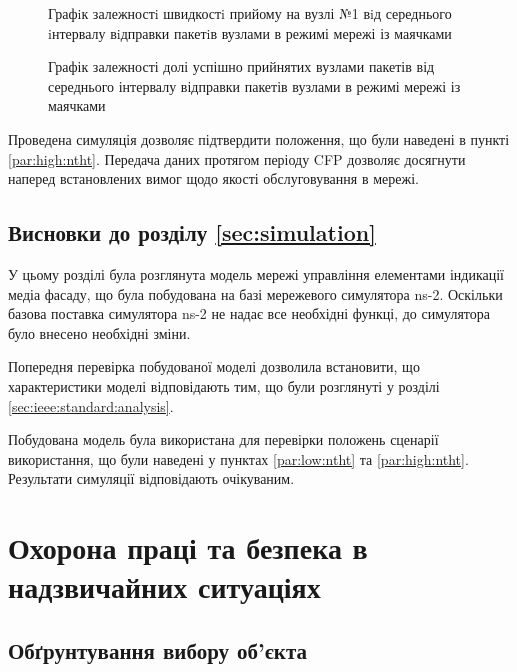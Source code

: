 \documentclass[a4paper,ukrainian,utf8,nocolumnsxix,floatsection,equationsection]{eskdtext}
\begin{document}
\begin{figure}[h]
	\centering
	\caption{\label{fig:result_test_backtraf_beac_brd_tp1}Графiк залежностi швидкостi прийому на вузлі №1 вiд середнього iнтервалу вiдправки пакетiв вузлами в режимі мережі із маячками}
\end{figure}

\begin{figure}[h]
	\centering
	\caption{\label{fig:result_test_backtraf_beac_brd_deliv}Графік залежності долі успішно прийнятих вузлами пакетів від середнього інтервалу відправки пакетів вузлами в режимі мережі із маячками}
\end{figure}


Проведена симуляція дозволяє підтвердити положення, що були наведені в пункті \ref{par:high:ntht}. Передача даних протягом періоду CFP дозволяє досягнути наперед встановлених вимог щодо якості обслуговування в мережі. 

\subsection{Висновки до розділу \ref{sec:simulation}}

У цьому розділі була розглянута модель мережі управління елементами індикації медіа фасаду, що була побудована на базі мережевого симулятора ns-2. Оскільки базова поставка симулятора ns-2 не надає все необхідні функці, до симулятора було внесено необхідні зміни.

Попередня перевірка побудованої моделі дозволила встановити, що характеристики моделі відповідають тим, що були розглянуті у розділі \ref{sec:ieee:standard:analysis}. 

Побудована модель була використана для перевірки положень сценарії використання, що були наведені у пунктах \ref{par:low:ntht} та \ref{par:high:ntht}. Результати симуляції відповідають очікуваним. 


\section{Охорона праці та безпека в надзвичайних ситуаціях}
\label{sec:work_safety}

\subsection{Обґрунтування вибору об’єкта}
\end{document}

